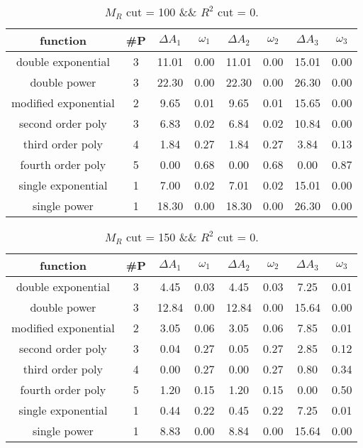  
\begin{table}[H] 
\begin{center} 
\begin{tabular}{|c|c|cc|cc|cc|} 
\hline function & \#P & $\Delta A_1$ & $\omega_1$ & $\Delta A_2$ & $\omega_2$ & $\Delta A_3$ & $\omega_3$ \\ \hline 
double exponential &  3 &  11.01 &   0.00 &  11.01 &   0.00 &  15.01 &   0.00 \\ 
double power &  3 &  22.30 &   0.00 &  22.30 &   0.00 &  26.30 &   0.00 \\ 
modified exponential &  2 &   9.65 &   0.01 &   9.65 &   0.01 &  15.65 &   0.00 \\ 
second order poly &  3 &   6.83 &   0.02 &   6.84 &   0.02 &  10.84 &   0.00 \\ 
third order poly &  4 &   1.84 &   0.27 &   1.84 &   0.27 &   3.84 &   0.13 \\ 
fourth order poly &  5 &   0.00 &   0.68 &   0.00 &   0.68 &   0.00 &   0.87 \\ 
single exponential &  1 &   7.00 &   0.02 &   7.01 &   0.02 &  15.01 &   0.00 \\ 
single power &  1 &  18.30 &   0.00 &  18.30 &   0.00 &  26.30 &   0.00 \\ 
\hline 
\end{tabular} 
\caption{$M_R$ cut = 100 \&\& $R^2$ cut = 0.} 
\label{tab:FitChoices_100_0} 
\end{center} 
\end{table} 
 
 
\begin{table}[H] 
\begin{center} 
\begin{tabular}{|c|c|cc|cc|cc|} 
\hline function & \#P & $\Delta A_1$ & $\omega_1$ & $\Delta A_2$ & $\omega_2$ & $\Delta A_3$ & $\omega_3$ \\ \hline 
double exponential &  3 &   4.45 &   0.03 &   4.45 &   0.03 &   7.25 &   0.01 \\ 
double power &  3 &  12.84 &   0.00 &  12.84 &   0.00 &  15.64 &   0.00 \\ 
modified exponential &  2 &   3.05 &   0.06 &   3.05 &   0.06 &   7.85 &   0.01 \\ 
second order poly &  3 &   0.04 &   0.27 &   0.05 &   0.27 &   2.85 &   0.12 \\ 
third order poly &  4 &   0.00 &   0.27 &   0.00 &   0.27 &   0.80 &   0.34 \\ 
fourth order poly &  5 &   1.20 &   0.15 &   1.20 &   0.15 &   0.00 &   0.50 \\ 
single exponential &  1 &   0.44 &   0.22 &   0.45 &   0.22 &   7.25 &   0.01 \\ 
single power &  1 &   8.83 &   0.00 &   8.84 &   0.00 &  15.64 &   0.00 \\ 
\hline 
\end{tabular} 
\caption{$M_R$ cut = 150 \&\& $R^2$ cut = 0.} 
\label{tab:FitChoices_150_0} 
\end{center} 
\end{table} 
 
